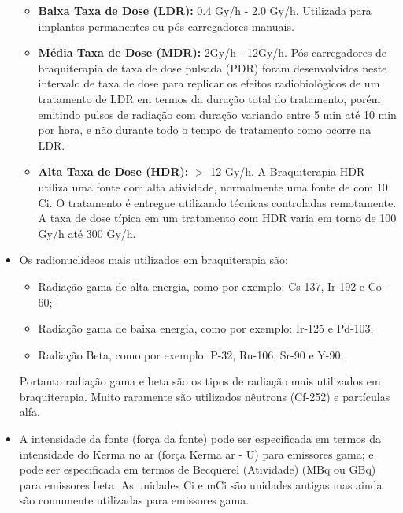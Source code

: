 \documentclass[11pt,a4paper]{article}
\newcounter{exemplo}
\begin{document}
\begin{exemplo}[8. Braquiterapia]
\begin{itemize}
            \begin{itemize}[label=\textcolor{CarnationPink}{\textopenbullet}]
                \item \textcolor{CarnationPink}{\textbf{Baixa Taxa de Dose (LDR):}} 0.4 Gy/h - 2.0 Gy/h. Utilizada para implantes permanentes ou pós-carregadores manuais. 
                \item \textcolor{CarnationPink}{\textbf{Média Taxa de Dose (MDR):}} 2Gy/h - 12Gy/h. Pós-carregadores de braquiterapia de taxa de dose pulsada (PDR) foram desenvolvidos neste intervalo de taxa de dose para replicar os efeitos radiobiológicos de um tratamento de LDR em termos da duração total do tratamento, porém emitindo pulsos de radiação com duração variando entre 5 min até 10 min por hora, e não durante todo o tempo de tratamento como ocorre na LDR.
                \item \textcolor{CarnationPink}{\textbf{Alta Taxa de Dose (HDR):}} $>$ 12 Gy/h. A Braquiterapia HDR utiliza uma fonte com alta atividade, normalmente uma fonte de  com 10 Ci. O tratamento é entregue utilizando técnicas controladas remotamente. A taxa de dose típica em um tratamento com HDR varia em torno de 100 Gy/h até 300 Gy/h.
            \end{itemize}

        \item Os radionuclídeos mais utilizados em braquiterapia são:
        
            \begin{itemize}[label=\textcolor{CarnationPink}{\textopenbullet}]
                \item Radiação gama de alta energia, como por exemplo: Cs-137, Ir-192 e Co-60;
                \item Radiação gama de baixa energia, como por exemplo: Ir-125 e Pd-103;
                \item Radiação Beta, como por exemplo: P-32, Ru-106, Sr-90 e Y-90;
            \end{itemize}

            Portanto radiação gama e beta são os tipos de radiação mais utilizados em braquiterapia. Muito raramente são utilizados nêutrons (Cf-252) e partículas alfa. 


        \item A intensidade da fonte (força da fonte) pode ser especificada em termos da intensidade do Kerma no ar (força Kerma ar - U) para emissores gama; e pode ser especificada em termos de Becquerel (Atividade) (MBq ou GBq) para emissores beta. As unidades Ci e mCi são unidades antigas mas ainda são comumente utilizadas para emissores gama.
        

\end{itemize}
\end{exemplo}
\end{document}
